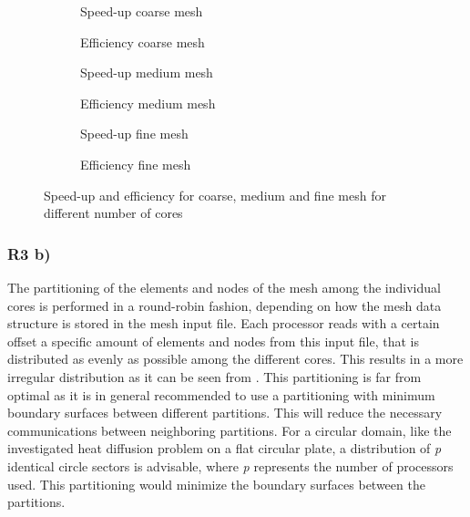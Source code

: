\begin{figure}[h!]
	\centering
	\begin{subfigure}{0.49\textwidth}
		\centering
		\resizebox{0.5\width}{!}{}
		\caption{\label{fig::SPcoarseMPI} Speed-up coarse mesh}
	\end{subfigure}
	\hfill
	\begin{subfigure}{0.49\textwidth}
		\centering
		\resizebox{0.5\width}{!}{}
		\caption{\label{fig::EffcoarseMPI} Efficiency coarse mesh}
	\end{subfigure}
	\hfill
	\begin{subfigure}{0.49\textwidth}
		\centering
		\resizebox{0.5\width}{!}{}
		\caption{\label{fig::SPmediumMPI} Speed-up medium mesh}
	\end{subfigure}
	\hfill
	\begin{subfigure}{0.49\textwidth}
		\centering
		\resizebox{0.5\width}{!}{}
		\caption{\label{fig::EffmediumMPI} Efficiency medium mesh}
	\end{subfigure}
	\hfill
	\begin{subfigure}{0.49\textwidth}
		\centering
		\resizebox{0.5\width}{!}{}
		\caption{\label{fig::SPfineMPI} Speed-up fine mesh}
	\end{subfigure}
	\hfill
	\begin{subfigure}{0.49\textwidth}
		\centering
		\resizebox{0.5\width}{!}{}
		\caption{\label{fig::EfffineMPI} Efficiency fine mesh}
	\end{subfigure}
	\caption{\label{fig::MPI} Speed-up and efficiency for coarse, medium and fine mesh for different number of cores}
\end{figure}
\clearpage

\subsubsection{R3 b) \label{sec:partitioning}}

The partitioning of the elements and nodes of the mesh among the individual cores is performed in a round-robin fashion, depending on how the mesh data structure is stored in the mesh input file. Each processor reads with a certain offset a specific amount of elements and nodes from this input file, that is distributed as evenly as possible among the different cores. This results in a more irregular distribution as it can be seen from . This partitioning is far from optimal as it is in general recommended to use a partitioning with minimum boundary surfaces between different partitions. This will reduce the necessary communications between neighboring partitions. For a circular domain, like the investigated heat diffusion problem on a flat circular plate, a distribution of \textit{p} identical circle sectors is advisable, where \textit{p} represents the number of processors used. This partitioning would minimize the boundary surfaces between the partitions.


